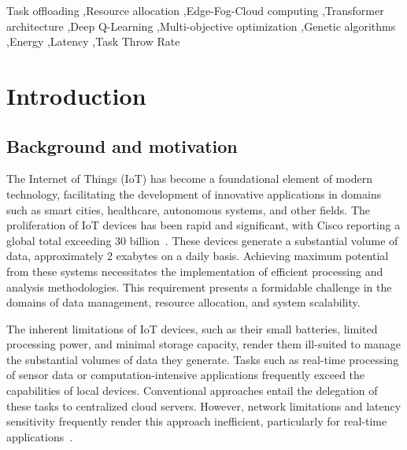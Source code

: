 \documentclass[preprint,3p,authoryear]{elsarticle}
\begin{document}
\begin{frontmatter}
\begin{keyword}
Task offloading \sep Resource allocation \sep Edge-Fog-Cloud computing \sep Transformer architecture \sep Deep Q-Learning \sep Multi-objective optimization \sep Genetic algorithms \sep Energy \sep Latency \sep Task Throw Rate



\end{keyword}

\end{frontmatter}



\section{Introduction}\label{sec:introduction}

\subsection{Background and motivation}\label{subsec:background}

The Internet of Things (IoT) has become a foundational element of modern technology, facilitating the development of innovative applications in domains such as smart cities, healthcare, autonomous systems, and other fields. The proliferation of IoT devices has been rapid and significant, with Cisco reporting a global total exceeding 30 billion~\citep{benaboura_comprehensive_nodate}. These devices generate a substantial volume of data, approximately 2 exabytes on a daily basis. Achieving maximum potential from these systems necessitates the implementation of efficient processing and analysis methodologies. This requirement presents a formidable challenge in the domains of data management, resource allocation, and system scalability.

The inherent limitations of IoT devices, such as their small batteries, limited processing power, and minimal storage capacity, render them ill-suited to manage the substantial volumes of data they generate. Tasks such as real-time processing of sensor data or computation-intensive applications frequently exceed the capabilities of local devices. Conventional approaches entail the delegation of these tasks to centralized cloud servers. However, network limitations and latency sensitivity frequently render this approach inefficient, particularly for real-time applications~\citep{benaboura_comprehensive_nodate}.
\end{document}
